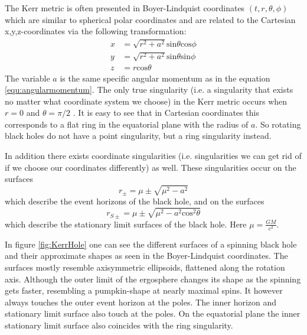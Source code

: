 \documentclass[english, oneside]{HYgradu}
\begin{document}
The Kerr metric is often presented in Boyer-Lindquist coordinates $(t, r, \theta, \phi)$ which are similar to spherical polar coordinates and are related to the Cartesian x,y,z-coordinates via the following transformation:
\begin{align*}
x &= \sqrt{r^2 + a^2} \mathrm{sin}\theta \mathrm{cos}\phi \\
y &= \sqrt{r^2 + a^2} \mathrm{sin}\theta \mathrm{sin}\phi \\
z &= r \mathrm{cos}\theta
\end{align*}
The variable $a$ is the same specific angular momentum as in the equation \eqref{equ:angularmomentum}. The only true singularity (i.e. a singularity that exists no matter what coordinate system we choose) in the Kerr metric occurs when $r=0$ and $\theta = \pi/2$ \citep{grintro}. It is easy to see that in Cartesian coordinates this corresponds to a flat ring in the equatorial plane with the radius of $a$. So rotating black holes do not have a point singularity, but a ring singularity instead.

In addition there exists coordinate singularities (i.e. singularities we can get rid of if we choose our coordinates differently) as well. These singularities occur on the surfaces
\begin{equation} \label{equ:evenhorizons}
r_\pm = \mu \pm \sqrt{\mu^2 - a^2}
\end{equation}
which describe the event horizons of the black hole, and on the surfaces
\begin{equation} \label{equ:statlimsurf}
r_{S \pm} = \mu \pm \sqrt{\mu^2 - a^2 \mathrm{cos}^2 \theta}
\end{equation}
which describe the stationary limit surfaces of the black hole. Here $\mu = \frac{GM}{c^2}$. 

In figure \ref{fig:KerrHole} one can see the different surfaces of a spinning black hole and their approximate shapes as seen in the Boyer-Lindquist coordinates. The surfaces mostly resemble axisymmetric ellipsoids, flattened along the rotation axis. Although the outer limit of the ergosphere changes its shape as the spinning gets faster, resembling a pumpkin-shape at nearly maximal spins. It however always touches the outer event horizon at the poles. The inner horizon and stationary limit surface also touch at the poles. On the equatorial plane the inner stationary limit surface also coincides with the ring singularity.
\end{document}
